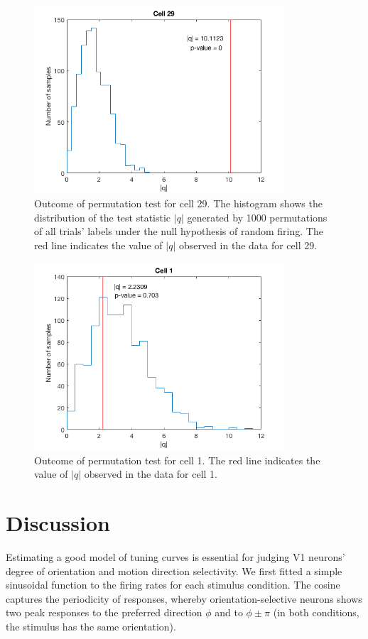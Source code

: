\documentclass[10pt]{article}
\begin{document}
\begin{figure}[!h]
\centering
\includegraphics[height=7cm]{permplot.png}
\caption{Outcome of permutation test for cell 29. The histogram shows the distribution of the test statistic $|q|$ generated by 1000 permutations of all trials' labels under the null hypothesis of random firing. The red line indicates the value of $|q|$ observed in the data for cell 29.
\label{permplot29}}
\end{figure}

\begin{figure}[!h]
\centering
\includegraphics[height=7cm]{permplot1.png}
\caption{Outcome of permutation test for cell 1. The red line indicates the value of $|q|$ observed in the data for cell 1.
\label{permplot1}}
\end{figure}

 
\section*{Discussion}

Estimating a good model of tuning curves is essential for judging V1 neurons' degree of orientation and motion direction selectivity. We first fitted a simple sinusoidal function to the firing rates for each stimulus condition. The cosine captures the periodicity of responses, whereby orientation-selective neurons shows two peak responses to the preferred direction $\phi$ and to $\phi \pm \pi$ (in both conditions, the stimulus has the same orientation). \\
\end{document}
